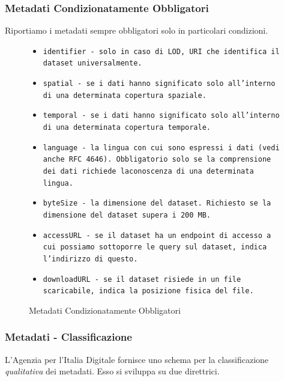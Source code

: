 \documentclass[8pt]{beamer}
\begin{document}
\begin{frame}
  \frametitle{Metadati Condizionatamente Obbligatori}

  Riportiamo i metadati sempre obbligatori solo in particolari condizioni.
  
  \begin{figure}
    \begin{itemize}[<+->]
    \item \tt{identifier} - solo in caso di LOD, URI che identifica il dataset universalmente.
    \item \tt{spatial} - se i dati hanno significato solo all'interno di una determinata copertura spaziale. 
    \item \tt{temporal} - se i dati hanno significato solo all'interno di una determinata copertura temporale.
    \item \tt{language} - la lingua con cui sono espressi i dati (vedi anche RFC 4646). Obbligatorio solo se 
      la comprensione dei dati richiede laconoscenza di una determinata lingua.
    \item \tt{byteSize} - la dimensione del dataset. Richiesto se la dimensione del dataset supera i 200 MB.
    \item \tt{accessURL} - se il dataset ha un endpoint di accesso  a cui possiamo
    sottoporre le query sul dataset, indica l'indirizzo di questo.
    \item \tt{downloadURL} - se il dataset risiede in un file scaricabile, indica la posizione fisica del file.
    \end{itemize}
    \caption{Metadati Condizionatamente Obbligatori}
  \end{figure}
\end{frame}

\begin{frame}
  \frametitle{Metadati - Classificazione}
  L'Agenzia per l'Italia Digitale fornisce uno schema per la classificazione
  \emph{qualitativa} dei metadati. Esso si sviluppa su due direttrici.
  \vspace{\baselineskip}
  

\end{frame}
\end{document}
